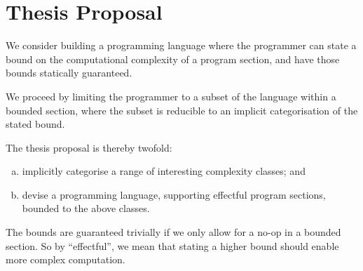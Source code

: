 
\section{Thesis Proposal}

We consider building a programming language where the programmer can state a
bound on the computational complexity of a program section, and have those
bounds statically guaranteed.

We proceed by limiting the programmer to a subset of the language within a
bounded section, where the subset is reducible to an implicit categorisation of
the stated bound. 

The thesis proposal is thereby twofold:

\begin{enumerate}[(a)]

\item implicitly categorise a range of interesting complexity classes; and

\item devise a programming language, supporting effectful program sections,
bounded to the above classes.

\end{enumerate}

The bounds are guaranteed trivially if we only allow for a no-op in a bounded
section. So by ``effectful'', we mean that stating a higher bound should enable
more complex computation.

